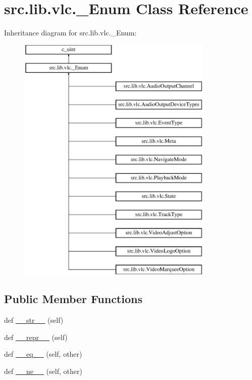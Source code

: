 \hypertarget{classsrc_1_1lib_1_1vlc_1_1__Enum}{}\section{src.\+lib.\+vlc.\+\_\+\+Enum Class Reference}
\label{classsrc_1_1lib_1_1vlc_1_1__Enum}
Inheritance diagram for src.\+lib.\+vlc.\+\_\+\+Enum\+:\begin{figure}[H]
\begin{center}
\leavevmode
\includegraphics[height=12.000000cm]{classsrc_1_1lib_1_1vlc_1_1__Enum}
\end{center}
\end{figure}
\subsection*{Public Member Functions}
\begin{DoxyCompactItemize}
\item 
def \hyperlink{classsrc_1_1lib_1_1vlc_1_1__Enum_a8ee3332104c851d949ba733cc5ef4b2c}{\+\_\+\+\_\+str\+\_\+\+\_\+} (self)
\item 
def \hyperlink{classsrc_1_1lib_1_1vlc_1_1__Enum_aa6dce4015a93caccc6e679fe5517c2a6}{\+\_\+\+\_\+repr\+\_\+\+\_\+} (self)
\item 
def \hyperlink{classsrc_1_1lib_1_1vlc_1_1__Enum_a0f47c8262d9cd976a021424c28733fab}{\+\_\+\+\_\+eq\+\_\+\+\_\+} (self, other)
\item 
def \hyperlink{classsrc_1_1lib_1_1vlc_1_1__Enum_aeaad711ab3794d8453ed172ce6adcbe4}{\+\_\+\+\_\+ne\+\_\+\+\_\+} (self, other)
\end{DoxyCompactItemize}
